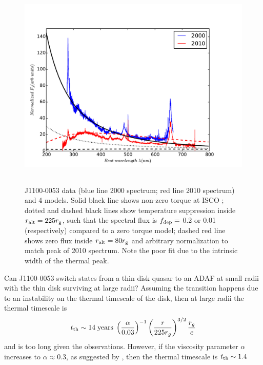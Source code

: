 \documentclass[11pt,a4paper]{article}
\begin{document}
\begin{figure}
  \centering
  \includegraphics[width=12.00cm, height=10.0cm, trim=0.3cm 0.0cm 2.0cm 0.0cm, clip]
  {../plots/models/mcd_gap_v3_3_b1.pdf}
  \caption[]{
J1100-0053 data (blue line 2000 spectrum; red line 2010 spectrum) and 4
models. Solid black line shows non-zero torque at ISCO
\citep[following] []{Afshordi_Paczynski2003}; dotted and dashed black
lines show temperature suppression inside $r_{\rm alt} = 225 r_{\rm
g}$, such that the spectral flux is $f_{\rm dep} = $ 0.2 or 0.01
(respectively) compared to a zero torque model; dashed red line shows
zero flux inside $r_{\rm alt} = 80 r_{\rm g}$ and arbitrary
normalization to match peak of 2010 spectrum. Note the poor fit due to
the intrinsic width of the thermal peak.
  }
  \label{fig:disk_suppression}
\end{figure}
Can J1100-0053 switch states from a thin disk quasar to an ADAF at small
radii with the thin disk surviving at large radii?  Assuming the
transition happens due to an instability on the thermal timescale of
the disk, then at large radii the thermal timescale is
\begin{equation}
    t_{\rm th} \sim 14 \; {\rm years} \; \left(\frac{\alpha}{0.03}\right)^{-1}
                                                \left(\frac{r}{225r_{g}}\right)^{3/2} 
                                                        \frac{r_{g}}{c}
\end{equation} 
and is too long given the observations. However, if the viscosity
parameter $\alpha$ increases to $\alpha \approx 0.3$, as suggested by
\citet{King2007}, then the thermal timescale is $t_{\rm th} \sim 1.4$
\end{document}
